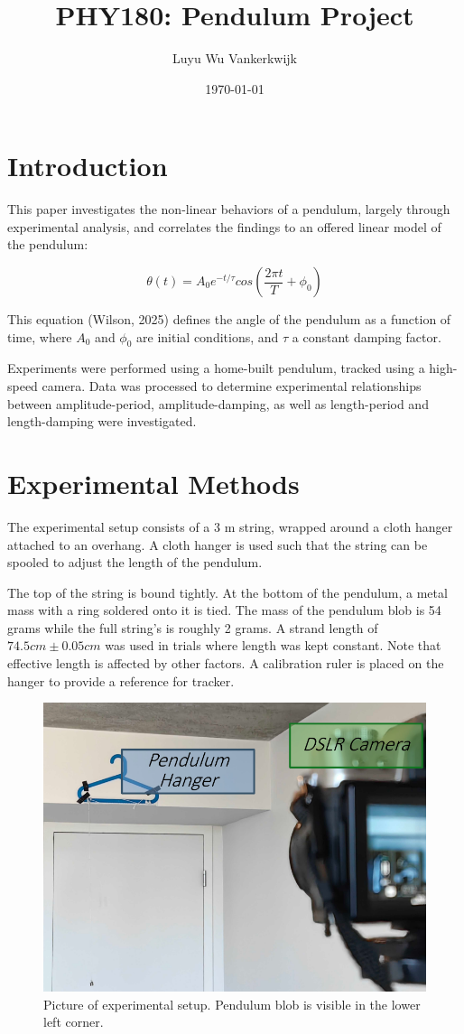 \documentclass[prl,twocolumn,amsmath,amssymb,superscriptaddress]{revtex4-2}
\begin{document}
\title{PHY180: Pendulum Project}
\author{Luyu Wu Vankerkwijk}
\date{\today}


\maketitle

\section{Introduction}
This paper investigates the non-linear behaviors of a pendulum, largely through experimental analysis, and correlates the findings to an offered linear model of the pendulum:

\begin{equation}
    \theta(t) = A_0e^{-t/\tau}cos\left(\frac{2\pi t}{T}+\phi_0\right)
    \label{eq:given}
\end{equation}

This equation (Wilson, 2025) defines the angle of the pendulum as a function of time, where $A_0$ and $\phi_0$ are initial conditions, and $\tau$ a constant damping factor.


Experiments were performed using a home-built pendulum, tracked using a high-speed camera. Data was processed to determine experimental relationships between amplitude-period, amplitude-damping, as well as length-period and length-damping were investigated.

\section{Experimental Methods}
The experimental setup consists of a 3 m string, wrapped around a cloth hanger attached to an overhang. A cloth hanger is used such that the string can be spooled to adjust the length of the pendulum.

The top of the string is bound tightly. At the bottom of the pendulum, a metal mass with a ring soldered onto it is tied. The mass of the pendulum blob is 54 grams while the full string's is roughly 2 grams. A strand length of $74.5 cm \pm 0.05 cm$ was used in trials where length was kept constant. Note that effective length is affected by other factors. A calibration ruler is placed on the hanger to provide a reference for tracker.

\begin{figure}[htb]
    \includegraphics[width=0.68\linewidth]{setup.png}
    \caption{Picture of experimental setup. Pendulum blob is visible in the lower left corner.}
    \label{fig:experiment_setup}
\end{figure}
\end{document}
